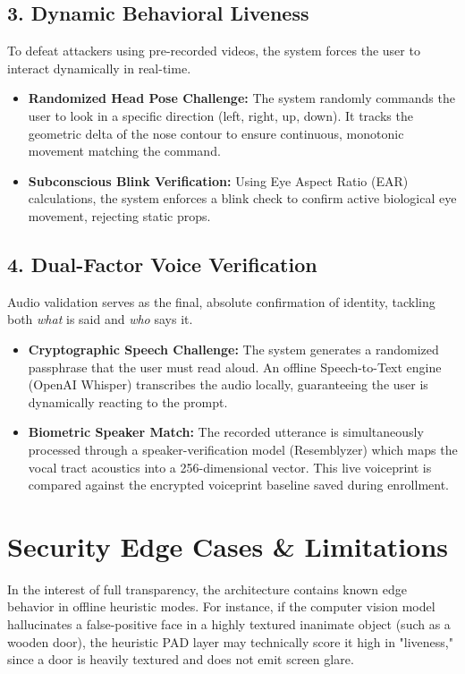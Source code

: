 \documentclass[11pt, a4paper]{article}
\begin{document}
\subsection{3. Dynamic Behavioral Liveness}
To defeat attackers using pre-recorded videos, the system forces the user to interact dynamically in real-time.
\begin{itemize}
    \item \textbf{Randomized Head Pose Challenge:} The system randomly commands the user to look in a specific direction (left, right, up, down). It tracks the geometric delta of the nose contour to ensure continuous, monotonic movement matching the command.
    \item \textbf{Subconscious Blink Verification:} Using Eye Aspect Ratio (EAR) calculations, the system enforces a blink check to confirm active biological eye movement, rejecting static props.
\end{itemize}

\subsection{4. Dual-Factor Voice Verification}
Audio validation serves as the final, absolute confirmation of identity, tackling both \textit{what} is said and \textit{who} says it.
\begin{itemize}
    \item \textbf{Cryptographic Speech Challenge:} The system generates a randomized passphrase that the user must read aloud. An offline Speech-to-Text engine (OpenAI Whisper) transcribes the audio locally, guaranteeing the user is dynamically reacting to the prompt.
    \item \textbf{Biometric Speaker Match:} The recorded utterance is simultaneously processed through a speaker-verification model (Resemblyzer) which maps the vocal tract acoustics into a 256-dimensional vector. This live voiceprint is compared against the encrypted voiceprint baseline saved during enrollment. 
\end{itemize}

\section{Security Edge Cases \& Limitations}
In the interest of full transparency, the architecture contains known edge behavior in offline heuristic modes. For instance, if the computer vision model hallucinates a false-positive face in a highly textured inanimate object (such as a wooden door), the heuristic PAD layer may technically score it high in "liveness," since a door is heavily textured and does not emit screen glare. 
\end{document}
